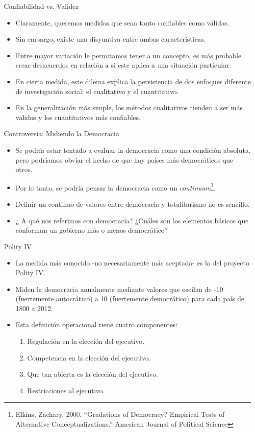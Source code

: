\documentclass[xcolor=dvipsnames]{beamer}
\begin{document}
\begin{frame}{Confiabilidad vs. Validez}
\begin{itemize}
\item Claramente, queremos medidas que sean tanto confiables como válidas.
\item Sin embargo, existe una disyuntiva entre ambas características.
\item Entre mayor variación le permitamos tener a un concepto, es más probable crear desacuerdos en relación a si este aplica a una situación particular.
\item En cierta medida, este dilema explica la persistencia de dos enfoques diferente de investigación social: el cualitativo y el cuantitativo.
\item En la generalización más simple, los métodos cualitativos tienden a ser más validos y los cuantitativos más confiables. 
\end{itemize}
\end{frame}

\begin{frame}{Controversia: Midiendo la Democracia}
\begin{itemize}
\justifying
\item Se podría estar tentado a evaluar la democracia como una condición absoluta, pero podríamos obviar el hecho de que hay países más democráticos que otros.
\item Por lo tanto, se podría pensar la democracia como un \emph{continuum}\footnote{Elkins, Zachary. 2000. “Gradations of Democracy? Empirical Tests of Alternative
	Conceptualizations.” American Journal of Political Science}.
\item Definir un continuo de valores entre democracia y totalitarismo no es sencillo.
\item ¿ A qué nos referimos con democracia? ¿Cuáles son los elementos básicos que conforman un gobierno más o menos democrático?
\end{itemize}
\end{frame}

\begin{frame}{Polity IV}
	\begin{itemize}
\justifying
\item La medida más conocido -no necesariamente más aceptada- es la del proyecto Polity IV.
\item Miden la democracia anualmente mediante valores que oscilan de -10 (fuertemente autocrático) a 10 (fuertemente democrático) para cada país de 1800 a 2012.
\item Esta definición operacional tiene cuatro componentes:
\begin{enumerate}
\item Regulación en la elección del ejecutivo.
\item Competencia en la elección del ejecutivo.
\item Que tan abierta es la elección del ejecutivo.
\item Restricciones al ejecutivo.
\end{enumerate}
	\end{itemize}

\end{frame}
\end{document}
